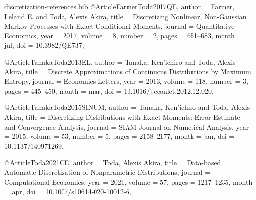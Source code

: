 \begin{filecontents*}{discretization-references.bib}
@Article{FarmerToda2017QE,
  author  = {Farmer, Leland E. and Toda, Alexis Akira},
  title   = {Discretizing Nonlinear, Non-{G}aussian {M}arkov Processes with Exact Conditional Moments},
  journal = {Quantitative Economics},
  year    = {2017},
  volume  = {8},
  number  = {2},
  pages   = {651--683},
  month   = jul,
  doi     = {10.3982/QE737},
}

@Article{TanakaToda2013EL,
  author  = {Tanaka, Ken'ichiro and Toda, Alexis Akira},
  title   = {Discrete Approximations of Continuous Distributions by Maximum Entropy},
  journal = {Economics Letters},
  year    = {2013},
  volume  = {118},
  number  = {3},
  pages   = {445--450},
  month   = mar,
  doi     = {10.1016/j.econlet.2012.12.020},
}

@Article{TanakaToda2015SINUM,
  author  = {Tanaka, Ken'ichiro and Toda, Alexis Akira},
  title   = {Discretizing Distributions with Exact Moments: Error Estimate and Convergence Analysis},
  journal = {{SIAM} Journal on Numerical Analysis},
  year    = {2015},
  volume  = {53},
  number  = {5},
  pages   = {2158--2177},
  month   = jan,
  doi     = {10.1137/140971269},
}

@Article{Toda2021CE,
  author  = {Toda, Alexis Akira},
  title   = {Data-based Automatic Discretization of Nonparametric Distributions},
  journal = {Computational Economics},
  year    = {2021},
  volume  = {57},
  pages   = {1217--1235},
  month   = apr,
  doi     = {10.1007/s10614-020-10012-6},
}
\end{filecontents*}

\documentclass[a4paper,12pt]{article}
\usepackage{amsmath,amssymb}

\usepackage[T1]{fontenc}
\usepackage{lmodern}
\usepackage{xcolor}
\usepackage{booktabs}
\usepackage{tabularx}
\usepackage{array}
\usepackage{listings}
\usepackage[inline,shortlabels]{enumitem}
\usepackage[margin=1.15in]{geometry}
\usepackage{setspace}
\usepackage{microtype}
\usepackage{csquotes}
\usepackage{hyperref}
\usepackage{doi}

\usepackage[
  style=ext-authoryear-comp,
  sorting=nyt,
  dashed=false,
  maxcitenames=2,
  maxbibnames=99,
  uniquelist=false,
  uniquename=false,
  giveninits=true,
  natbib,
  date=year
]{biblatex}

